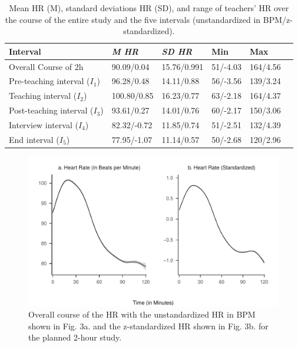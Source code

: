 \documentclass[preprint, 3p,
authoryear]{elsarticle} %
\begin{document}
\renewcommand{\arraystretch}{1.5}

\begin{table}[ht]
    \centering
    \begin{tabularx}{\textwidth}{lXXXXX}
        \toprule
        Interval & \textit{M HR} & \textit{SD HR} & Min & Max \\
        \midrule
        Overall Course of 2h & 90.09/0.04\footnotemark[9] & 15.76/0.991 & 51/-4.03 & 164/4.56 \\
        Pre-teaching interval ($I_1$) & 96.28/0.48 & 14.11/0.88 & 56/-3.56 & 139/3.24 \\
        Teaching interval ($I_2$) & 100.80/0.85 & 16.23/0.77 & 63/-2.18 & 164/4.37 \\
        Post-teaching interval ($I_3$) & 93.61/0.27 & 14.01/0.76 & 60/-2.17 & 150/3.06 \\
        Interview interval ($I_4$) & 82.32/-0.72 & 11.85/0.74 & 51/-2.51 & 132/4.39 \\
        End interval ($I_5$) & 77.95/-1.07 & 11.14/0.57 & 50\footnotemark[10]/-2.68 & 120/2.96 \\
        \bottomrule
    \end{tabularx}
    \caption{Mean HR (M), standard deviations HR (SD), and range of teachers’ HR over the course of the entire study and the five intervals (unstandardized in BPM/z-standardized).}
    \label{tab_1}

    
\end{table}

\begin{figure}[H]
  \centering
  \includegraphics[width=1\textwidth]{plots_publication/loess_plot_std_unstd_new.pdf}
  \caption{Overall course of the HR with the unstandardized HR in BPM shown in Fig. 3a. and the z-standardized HR shown in Fig. 3b. for the planned 2-hour study.}
  \label{Overall course of the HR with the unstandardized HR in BPM shown in Fig. 3a. and the z-standardized HR shown in Fig. 3b. for the planned 2-hour study.}
\end{figure}
\end{document}
